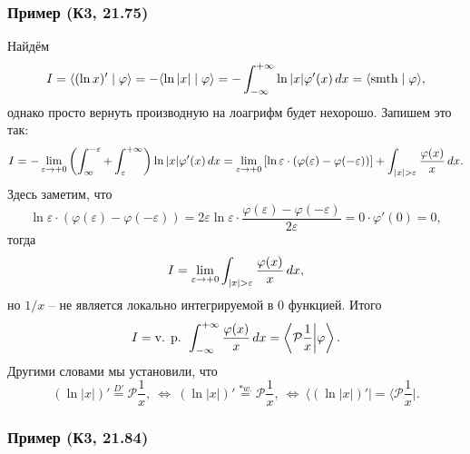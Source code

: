 
\subsubsection*{Пример (К3, 21.75)}


Найдём 
\begin{equation*}
    I = \langle (\ln x)' \mid \varphi \rangle = - \langle \ln|x| \mid \varphi \rangle = 
    - \int_{-\infty}^{+\infty} \ln |x| \varphi'(x) \, d x = \langle \text{smth} \mid \varphi \rangle,
\end{equation*}
однако просто вернуть производную на лоагрифм будет нехорошо. Запишем это так:
\begin{equation*}
    I =  - \lim_{\varepsilon \to + 0} \left(
        \int_{\infty}^{-\varepsilon} + \int_{\varepsilon}^{+\infty}
    \right) \ln |x| \varphi'(x) \d x = \lim_{\varepsilon \to +0}\left[
        \ln \varepsilon \cdot (\varphi(\varepsilon)-\varphi(-\varepsilon))
    \right] + \int_{|x|>\varepsilon} \frac{\varphi(x)}{x} \d x.
\end{equation*}
Здесь заметим, что
\begin{equation*}
    \ln \varepsilon \cdot (\varphi(\varepsilon) - \varphi(-\varepsilon)) = 2 \varepsilon \ln \varepsilon \cdot \frac{\varphi(\varepsilon)-\varphi(-\varepsilon)}{2 \varepsilon} = 0 \cdot \varphi'(0) = 0,
\end{equation*}
тогда 
\begin{equation*}
    I = \lim_{\varepsilon \to +0} \int_{|x|>\varepsilon} \frac{\varphi(x)}{x}\d x,
\end{equation*}
но $1/x$ -- не является локально интегрируемой в $0$ функцией. Итого
\begin{equation*}
    I = \text{v. p. } \int_{-\infty}^{+\infty} \frac{\varphi(x)}{x} \, d x = 
    \left\langle  
                \mathcal P \frac{1}{x} \bigg| \varphi
            \right\rangle.
\end{equation*}
Другими словами мы установили, что
\begin{equation*}
    (\ln |x|)' \overset{D'}{=} \mathcal P \frac{1}{x}, \ 
    \Leftrightarrow \ 
    (\ln |x|)' \overset{* w.}{=} \mathcal P \frac{1}{x},
    \ 
    \Leftrightarrow \ 
    \big\langle (\ln |x|)' \big| = \bigg\langle \mathcal P \frac{1}{x} \bigg|.
\end{equation*}

\subsubsection*{Пример (К3, 21.84)}

